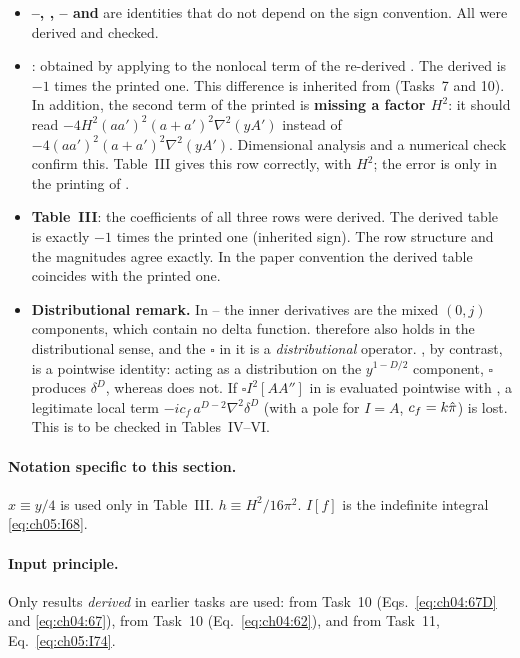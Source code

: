\begin{discbox}
\begin{itemize}[leftmargin=12pt,itemsep=2pt]
\item \textbf{--, , -- and } are identities that do not depend on the sign convention. All were derived and checked.
\item \textbf{}: obtained by applying  to the nonlocal term of the re-derived . The derived  is $-1$ times the printed one.
This difference is inherited from  (Tasks~7 and 10).
In addition, the second term of the printed  is \textbf{missing a factor $H^2$}: it should read $-4H^2(aa')^2(a+a')^2\nabla^2(yA')$ instead of $-4(aa')^2(a+a')^2\nabla^2(yA')$.
Dimensional analysis and a numerical check confirm this. Table~III gives this row correctly, with $H^2$; the error is only in the printing of .
\item \textbf{Table~III}: the coefficients of all three rows were derived. The derived table is exactly $-1$ times the printed one (inherited sign). The row structure and the magnitudes agree exactly.
In the paper convention the derived table coincides with the printed one.
\item \textbf{Distributional remark.} In -- the inner derivatives are the mixed $(0,j)$ components, which contain no delta function.
 therefore also holds in the distributional sense, and the $\square$ in it is a \emph{distributional} operator.
, by contrast, is a pointwise identity: acting as a distribution on the $y^{1-D/2}$ component, $\square$ produces $\delta^D$, whereas  does not.
If $\square I^2[AA'']$ in  is evaluated pointwise with , a legitimate local term $-ic_f\,a^{D-2}\nabla^2\delta^D$ (with a pole for $I=A$, $c_f=k\hat\pi$) is lost.
This is to be checked in Tables~IV--VI.
\end{itemize}
\end{discbox}

\paragraph{Notation specific to this section.}
$x\equiv y/4$ is used only in Table~III. $h\equiv H^2/16\pi^2$. $I[f]$ is the indefinite integral \eqref{eq:ch05:I68}.
\paragraph{Input principle.} Only results \emph{derived} in earlier tasks are used:
 from Task~10 (Eqs.~\eqref{eq:ch04:67D} and \eqref{eq:ch04:67}),  from Task~10 (Eq.~\eqref{eq:ch04:62}), and  from Task~11, Eq.~\eqref{eq:ch05:I74}.

